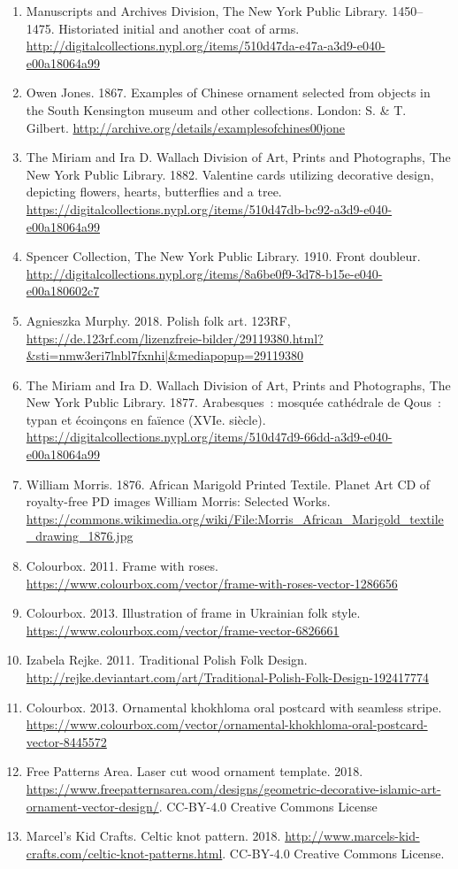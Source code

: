 \begin{enumerate}
    \item{Manuscripts and Archives Division, The New York Public Library. 1450--1475. Historiated initial and another coat of arms. \url{http://digitalcollections.nypl.org/items/510d47da-e47a-a3d9-e040-e00a18064a99}}
    \item{Owen Jones. 1867. Examples of Chinese ornament selected from objects in the South Kensington museum and other collections. London: S. \& T. Gilbert. \url{http://archive.org/details/examplesofchines00jone}}
    \item{The Miriam and Ira D. Wallach Division of Art, Prints and Photographs, The New York Public Library. 1882. Valentine cards utilizing decorative design, depicting flowers, hearts, butterflies and a tree. \url{https://digitalcollections.nypl.org/items/510d47db-bc92-a3d9-e040-e00a18064a99}}
    \item{Spencer Collection, The New York Public Library. 1910. Front doubleur. \url{http://digitalcollections.nypl.org/items/8a6be0f9-3d78-b15e-e040-e00a180602c7}}
    \item {Agnieszka Murphy. 2018. Polish folk art. 123RF, \url{https://de.123rf.com/lizenzfreie-bilder/29119380.html?\&sti=nmw3eri7lnbl7fxnhi|\&mediapopup=29119380}}
    \item{The Miriam and Ira D. Wallach Division of Art, Prints and Photographs, The New York Public Library. 1877. Arabesques~: mosqu\'{e}e cath\'{e}drale de Qous~: typan et \'{e}coin\c{c}ons en fa\"{i}ence (XVIe. si\`{e}cle). \url{https://digitalcollections.nypl.org/items/510d47d9-66dd-a3d9-e040-e00a18064a99}}
    \item{William Morris. 1876. African Marigold Printed Textile. Planet Art CD of royalty-free PD images William Morris: Selected Works. \url{https://commons.wikimedia.org/wiki/File:Morris\_African\_Marigold\_textile\_drawing\_1876.jpg}}
    \item{Colourbox. 2011. Frame with roses. \url{https://www.colourbox.com/vector/frame-with-roses-vector-1286656}}
    \item{Colourbox. 2013. Illustration of frame in Ukrainian folk style. \url{https://www.colourbox.com/vector/frame-vector-6826661}}
    \item{Izabela Rejke. 2011. Traditional Polish Folk Design. \url{http://rejke.deviantart.com/art/Traditional-Polish-Folk-Design-192417774}}
    \item{Colourbox. 2013. Ornamental khokhloma oral postcard with seamless stripe. \url{https://www.colourbox.com/vector/ornamental-khokhloma-oral-postcard-vector-8445572}}
    
    \item{Free Patterns Area. Laser cut wood ornament template. 2018. \url{https://www.freepatternsarea.com/designs/geometric-decorative-islamic-art-ornament-vector-design/}. CC-BY-4.0 Creative Commons License}
    \item {Marcel's Kid Crafts. Celtic knot pattern. 2018. \url{http://www.marcels-kid-crafts.com/celtic-knot-patterns.html}. CC-BY-4.0 Creative Commons License.}
\end{enumerate}

% 